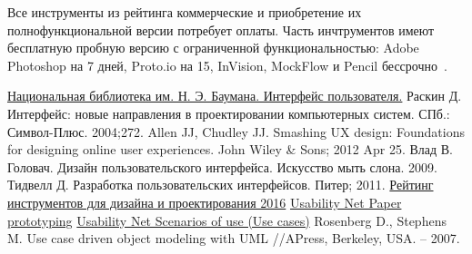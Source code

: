 \documentclass{../industrial-development}
\begin{document}
Все инструменты из рейтинга коммерческие и приобретение их полнофункциональной версии потребует оплаты. Часть инчтрументов имеют бесплатную пробную версию с ограниченной функциональностью: Adobe Photoshop на 7 дней, Proto.io на 15, InVision, MockFlow и Pencil бессрочно~\cite{Rating2016}.

\begin{thebibliography}{99}
 \href{http://ru.bmstu.wiki/Интерфейс_пользователя}{Национальная библиотека им. Н. Э. Баумана. Интерфейс пользователя.}
 Раскин Д. Интерфейс: новые направления в проектировании компьютерных систем. СПб.: Символ-Плюс. 2004;272.
 Allen JJ, Chudley JJ. Smashing UX design: Foundations for designing online user experiences. John Wiley \& Sons; 2012 Apr 25.
 Влад В. Головач. Дизайн пользовательского интерфейса. Искусство мыть слона. 2009.
 Тидвелл Д. Разработка пользовательских интерфейсов. Питер; 2011.
 \href{https://tagline.ru/graphic-ui-ux-design-instruments-rating/}{Рейтинг инструментов для дизайна и проектирования 2016}
 \href{http://www.usabilitynet.org/tools/prototyping.htm}{Usability Net Paper prototyping}
 \href{http://www.usabilitynet.org/tools/scenarios.htm}{Usability Net Scenarios of use (Use cases)}
 Rosenberg D., Stephens M. Use case driven object modeling with UML //APress, Berkeley, USA. – 2007.
\end{thebibliography}
\end{document}
